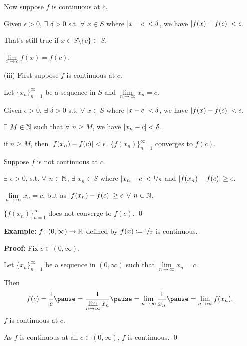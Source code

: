 \documentclass[10pt,aspectratio=169]{beamer}
\begin{document}
\begin{frame}
Now suppose $f$ is continuous at $c$.

\pause
Given $\epsilon > 0$, $\exists$ $\delta > 0$
s.t. $\forall$ $x \in S$ where $\left\lvert {x-c} \right\rvert < \delta$, we have
$\left\lvert {f(x)-f(c)} \right\rvert < \epsilon$.

\pause
That's still true if $x \in S \setminus \{ c \} \subset S$.

\pause
\thus \quad $\lim\limits_{x\to c} f(x) = f(c)$.

\pause
\medskip

(iii)
First suppose $f$ is continuous at $c$.

\pause
Let $\{ x_n \}_{n=1}^\infty$ be a sequence in $S$ and
$\lim\limits_{n\to\infty} x_n = c$.

\pause
Given $\epsilon > 0$, $\exists$ $\delta > 0$ s.t.
$\forall$ $x \in S$ where $\left\lvert {x-c} \right\rvert < \delta$, we have
$\left\lvert {f(x)-f(c)} \right\rvert < \epsilon$.

\pause
$\exists$ $M \in {\mathbb{N}}$
such that $\forall$ $n \geq M$, we have $\left\lvert {x_n-c} \right\rvert < \delta$.

\pause
\thus \quad if
$n \geq M$, then $\left\lvert {f(x_n)-f(c)} \right\rvert < \epsilon$.
\pause
\wthus $\bigl\{ f(x_n) \bigr\}_{n=1}^\infty$ converges to $f(c)$.

\pause
\medskip

Suppose $f$ is not continuous at $c$.

\pause
$\exists$ $\epsilon > 0$,
s.t. $\forall$ $n \in {\mathbb{N}}$,
$\exists$ $x_n \in S$
where
$\left\lvert {x_n-c} \right\rvert < \nicefrac{1}{n}$ and
$\left\lvert {f(x_n)-f(c)} \right\rvert \geq \epsilon$.

\pause
$\lim\limits_{n\to\infty} x_n = c$,
\quad
but as $\left\lvert {f(x_n)-f(c)} \right\rvert \geq \epsilon$ $\forall$ $n \in {\mathbb{N}}$,

\pause
\thus \quad $\{ f(x_n) \}_{n=1}^\infty$
does not converge to $f(c)$.
\qed

\end{frame}

\begin{frame}

\textbf{Example:}
$f \colon (0,\infty) \to {\mathbb{R}}$ defined by
$f(x) \coloneqq \nicefrac{1}{x}$ is continuous.

\pause
\medskip

\textbf{Proof:} Fix $c \in (0,\infty)$.  

\pause
Let $\{ x_n \}_{n=1}^\infty$ be a sequence in $(0,\infty)$ such that
$\lim\limits_{n\to\infty} x_n = c$.

\pause
Then
\[
f(c) = \frac{1}{c}
\pause
=
\frac{1}{\lim\limits_{n\to\infty} x_n}
\pause
=
\lim_{n \to \infty} \frac{1}{x_n}
\pause
=
\lim_{n \to \infty} f(x_n) .
\]
\pause
\thus \quad $f$ is continuous at $c$.

\pause
\medskip

As $f$ is continuous at all $c \in (0,\infty)$, $f$ is continuous. \qed

\end{frame}
\end{document}
